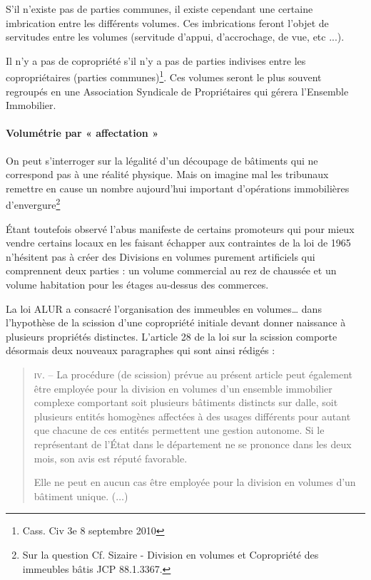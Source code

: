 				S'il n'existe pas de parties communes, il existe cependant une certaine imbrication entre les différents
				volumes. Ces imbrications feront l'objet de servitudes entre les volumes (servitude d'appui, d'accrochage,
				de vue, etc ...).
				
				Il n’y a pas de copropriété s’il n’y a pas de parties indivises entre les copropriétaires (parties communes)\footnote{
				Cass. Civ 3e 8 septembre 2010
				}. Ces volumes seront le plus souvent regroupés en une Association Syndicale de Propriétaires qui gérera
				l'Ensemble Immobilier.
				
			\paragraph{Volumétrie par « affectation »}
				On peut s'interroger sur la légalité d'un découpage de bâtiments qui ne correspond pas à une réalité
				physique. Mais on imagine mal les tribunaux remettre en cause un nombre aujourd'hui important
				d'opérations immobilières d'envergure\footnote{
				Sur la question Cf. Sizaire - Division en volumes et Copropriété des immeubles bâtis JCP 88.1.3367.
				}
				
				Étant toutefois observé l'abus manifeste de certains promoteurs qui pour mieux vendre certains locaux en
				les faisant échapper aux contraintes de la loi de 1965 n'hésitent pas à créer des Divisions en volumes
				purement artificiels qui comprennent deux parties : un volume commercial au rez de chaussée et un
				volume habitation pour les étages au-dessus des commerces.
				
				La loi ALUR a consacré l’organisation des immeubles en volumes… dans l’hypothèse de la scission d’une
				copropriété initiale devant donner naissance à plusieurs propriétés distinctes. L’article 28 de la loi sur la
				scission comporte désormais deux nouveaux paragraphes qui sont ainsi rédigés :
				\begin{quote}
					\textsc{iv}. – La procédure (de scission) prévue au présent article peut également être employée pour la
					division en volumes d’un ensemble immobilier complexe comportant soit plusieurs bâtiments
					distincts sur dalle, soit plusieurs entités homogènes affectées à des usages différents pour autant
					que chacune de ces entités permettent une gestion autonome. Si le représentant de l'État dans le
					département ne se prononce dans les deux mois, son avis est réputé favorable.
					
					Elle ne peut en aucun cas être employée pour la division en volumes d’un bâtiment unique. ($\dots$)
				\end{quote}
			
